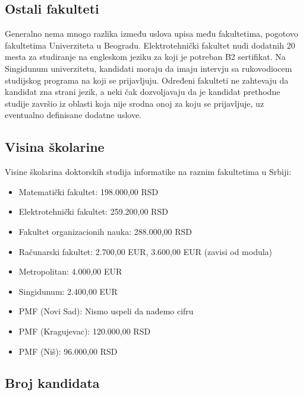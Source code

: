 \documentclass[a4paper]{article}
\begin{document}
\subsection{Ostali fakulteti}

Generalno nema mnogo razlika između uslova upisa među fakultetima, pogotovo fakultetima Univerziteta u Beogradu. Elektrotehnički fakultet nudi dodatnih 20 mesta za studiranje na engleskom jeziku za koji je potreban B2 sertifikat\cite{konkursETF}. Na Singidunum univerzitetu, kandidati moraju da imaju intervju sa rukovodiocem studijskog programa na koji se prijavljuju\cite{konkursSingidunum}. Određeni fakulteti ne zahtevaju da kandidat zna strani jezik, a neki čak dozvoljavaju da je kandidat prethodne studije završio iz oblasti koja nije srodna onoj za koju se prijavljuje, uz eventualno definisane dodatne uslove. 

\subsection{Visina školarine}

Visine školarina doktorskih studija informatike na raznim fakultetima u Srbiji: 
\begin{itemize} 
\item
Matematički fakultet: 198.000,00 RSD \cite{konkursMATF}
\item
Elektrotehnički fakultet: 259.200,00 RSD \cite{konkursETF}
\item
Fakultet organizacionih nauka: 288.000,00 RSD \cite{konkursFON}
\item
Računarski fakultet: 2.700,00 EUR, 3.600,00 EUR (zavisi od modula) \cite{konkursRAF}
\item
Metropolitan: 4.000,00 EUR \cite{konkursMetropolitan}
\item
Singidunum: 2.400,00 EUR \cite{konkursSingidunum}
\item
PMF (Novi Sad): Nismo uspeli da nađemo cifru \cite{konkursNoviSad}
\item
PMF (Kragujevac): 120.000,00 RSD \cite{konkursKragujevac}
\item
PMF (Niš): 96.000,00 RSD \cite{konkursNis}

\end{itemize}

\subsection{Broj kandidata}
\end{document}
